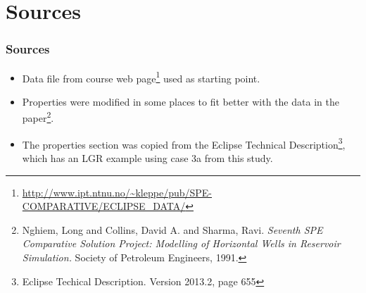 \section{Sources}

\begin{frame}
    \frametitle{Sources}
    \begin{itemize}
        \item Data file from course web page\footnote{\url{http://www.ipt.ntnu.no/~kleppe/pub/SPE-COMPARATIVE/ECLIPSE_DATA/}} used as starting point.
        \item Properties were modified in some places to fit better with the data in the paper\footnote{Nghiem, Long and Collins, David A. and Sharma, Ravi. \emph{Seventh SPE Comparative Solution Project: Modelling of Horizontal Wells in Reservoir Simulation.} Society of Petroleum Engineers, 1991.}.
        \item The properties section was copied from the Eclipse Technical Description\footnote{Eclipse Techical Description. Version 2013.2, page 655}, which has an LGR example using case 3a from this study.
    \end{itemize}
\end{frame}
